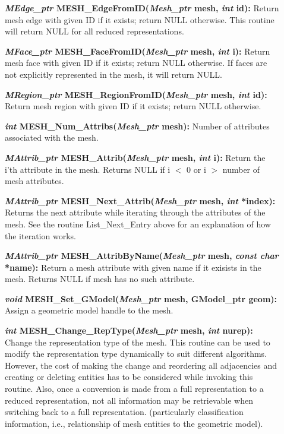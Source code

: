 \documentclass[12pt]{article}
\begin{document}
\begin{description}
\item[]\textbf{\textit{MEdge\_ptr} MESH\_EdgeFromID(\textit{Mesh\_ptr}
    mesh, \textit{int} id):} Return mesh edge with given ID if it
  exists; return NULL otherwise. This routine will return NULL for all
  reduced representations.

\item[]\textbf{\textit{MFace\_ptr} MESH\_FaceFromID(\textit{Mesh\_ptr}
    mesh, \textit{int} i):} Return mesh face with given ID if it
  exists; return NULL otherwise. If faces are not explicitly
  represented in the mesh, it will return NULL.


\item[]\textbf{\textit{MRegion\_ptr}
    MESH\_RegionFromID(\textit{Mesh\_ptr} mesh, \textit{int} id):}
  Return mesh region with given ID if it exists; return NULL
  otherwise.

\item[]

\item[]\textbf{\textit{int} MESH\_Num\_Attribs(\textit{Mesh\_ptr}
    mesh):} Number of attributes associated with the mesh.
  
\item[]\textbf{\textit{MAttrib\_ptr} MESH\_Attrib(\textit{Mesh\_ptr}
    mesh, \textit{int} i):} Return the i'th attribute in the mesh.
  Returns NULL if i $<$ 0 or i $>$ number of mesh attributes.
 
\item[]\textbf{\textit{MAttrib\_ptr}
    MESH\_Next\_Attrib(\textit{Mesh\_ptr} mesh, \textit{int} *index):}
  Returns the next attribute while iterating through the attributes of
  the mesh. See the routine List\_Next\_Entry above for an explanation
  of how the iteration works.
  
\item[]\textbf{\textit{MAttrib\_ptr}
    MESH\_AttribByName(\textit{Mesh\_ptr} mesh, \textit{const char}
    *name):} Return a mesh attribute with given name if it exisists in
  the mesh. Returns NULL if mesh has no such attribute.

\item[]
  

\item[]\textbf{\textit{void} MESH\_Set\_GModel(\textit{Mesh\_ptr} mesh,
GModel\_ptr geom):} Assign a geometric model handle to the mesh.

\item[]\textbf{\textit{int} MESH\_Change\_RepType(\textit{Mesh\_ptr} mesh,
\textit{int} nurep):} Change the representation type of the mesh. This
routine can be used to modify the representation type dynamically to
suit different algorithms.  However, the cost of making the change and
reordering all adjacencies and creating or deleting entities has to be
considered while invoking this routine. Also, once a conversion is
made from a full representation to a reduced representation, not all
information may be retrievable when switching back to a full
representation.  (particularly classification information, i.e.,
relationship of mesh entities to the geometric model).


\end{description}
\end{document}
